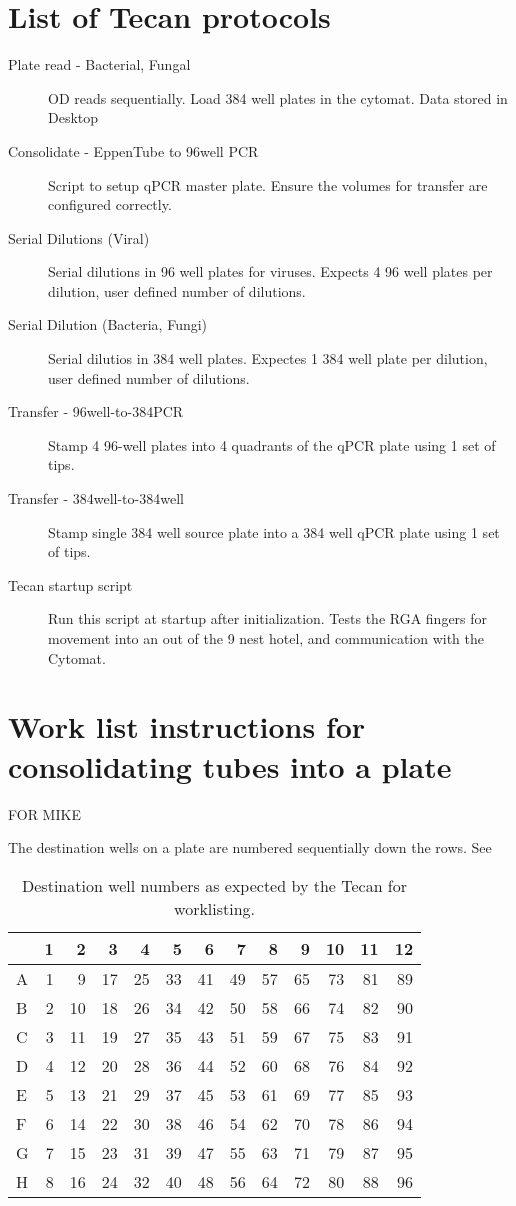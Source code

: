 \documentclass{article}
\begin{document}
\section{List of Tecan protocols}
\begin{description}
\item[Plate read - Bacterial, Fungal] OD reads sequentially. Load 384 well plates in the cytomat. Data stored in Desktop
\item[Consolidate - EppenTube to 96well PCR] Script to setup qPCR master plate. Ensure the volumes for transfer are configured correctly.
\item[Serial Dilutions (Viral)]  Serial dilutions in 96 well plates for viruses. Expects 4 96 well plates per dilution, user defined number of dilutions.
\item[Serial Dilution (Bacteria, Fungi)] Serial dilutios in 384 well plates. Expectes 1 384 well plate per dilution, user defined number of dilutions.
\item[Transfer - 96well-to-384PCR] Stamp 4 96-well plates into 4 quadrants of the qPCR plate using 1 set of tips.
\item[Transfer - 384well-to-384well] Stamp single 384 well source plate into a 384 well qPCR plate using 1 set of tips.
\item[Tecan startup script] Run this script at startup after initialization. Tests the RGA fingers for movement into an out of the 9 nest hotel, and communication with the Cytomat.
\end{description}

\section{Work list instructions for consolidating tubes into a plate}
FOR MIKE

The destination wells on a plate are numbered sequentially down the rows. See 

\begin{table}
  \centering
\begin{tabular}{lrrrrrrrrrrrr}
 & 1 & 2 & 3 & 4 & 5 & 6 & 7 & 8 & 9 & 10 & 11 & 12\\
\hline
A & 1 & 9 & 17 & 25 & 33 & 41 & 49 & 57 & 65 & 73 & 81 & 89\\
B & 2 & 10 & 18 & 26 & 34 & 42 & 50 & 58 & 66 & 74 & 82 & 90\\
C & 3 & 11 & 19 & 27 & 35 & 43 & 51 & 59 & 67 & 75 & 83 & 91\\
D & 4 & 12 & 20 & 28 & 36 & 44 & 52 & 60 & 68 & 76 & 84 & 92\\
E & 5 & 13 & 21 & 29 & 37 & 45 & 53 & 61 & 69 & 77 & 85 & 93\\
F & 6 & 14 & 22 & 30 & 38 & 46 & 54 & 62 & 70 & 78 & 86 & 94\\
G & 7 & 15 & 23 & 31 & 39 & 47 & 55 & 63 & 71 & 79 & 87 & 95\\
H & 8 & 16 & 24 & 32 & 40 & 48 & 56 & 64 & 72 & 80 & 88 & 96\\
\end{tabular}

\caption{Destination well numbers as expected by the Tecan for worklisting.}
\label{tab:destinationmap}
\end{table}
\end{document}
